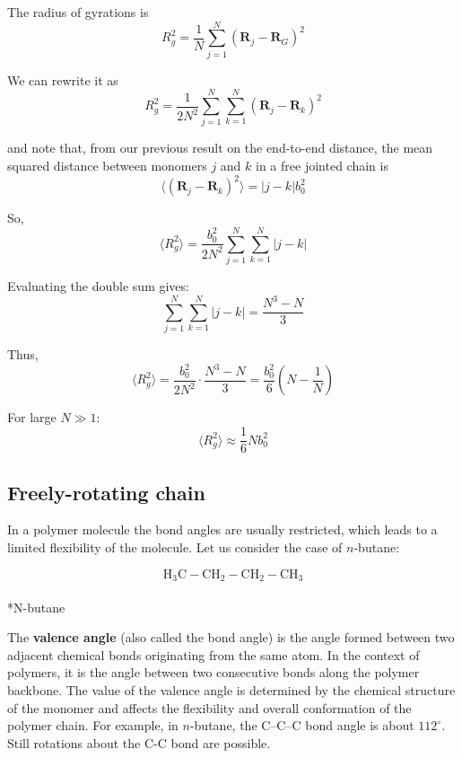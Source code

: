 \documentclass[
  letterpaper,
  enabledeprecatedfontcommands]{report}
\makeatletter
\let\oldparagraph\paragraph
\renewcommand{\paragraph}{
    \@ifstar
      \xxxParagraphStar
      \xxxParagraphNoStar
  }
\newcommand{\xxxParagraphStar}[1]{\oldparagraph*{#1}\mbox{}}
\newcommand{\xxxParagraphNoStar}[1]{\oldparagraph{#1}\mbox{}}
\makeatother
\begin{document}
\begin{tcolorbox}[enhanced jigsaw, toprule=.15mm, opacityback=0, colbacktitle=quarto-callout-note-color!10!white, title=\textcolor{quarto-callout-note-color}{\faInfo}\hspace{0.5em}{Proof}, leftrule=.75mm, rightrule=.15mm, bottomtitle=1mm, breakable, colframe=quarto-callout-note-color-frame, colback=white, toptitle=1mm, left=2mm, titlerule=0mm, coltitle=black, arc=.35mm, bottomrule=.15mm, opacitybacktitle=0.6]

The radius of gyrations is \[
R_g^2=\frac{1}{N} \sum_{j=1}^N\left(\mathbf{R}_j-\mathbf{R}_G\right)^2
\]

We can rewrite it as \[
R_g^2 = \frac{1}{2N^2} \sum_{j=1}^N \sum_{k=1}^N (\mathbf{R}_j - \mathbf{R}_k)^2
\]

and note that, from our previous result on the end-to-end distance, the
mean squared distance between monomers \(j\) and \(k\) in a free jointed
chain is \[
\langle (\mathbf{R}_j - \mathbf{R}_k)^2 \rangle = |j - k| b_0^2
\]

So, \[
\langle R_g^2 \rangle = \frac{b_0^2}{2N^2} \sum_{j=1}^N \sum_{k=1}^N |j - k|
\]

Evaluating the double sum gives: \[
\sum_{j=1}^N \sum_{k=1}^N |j - k| = \frac{N^3 - N}{3}
\]

Thus, \[
\langle R_g^2 \rangle = \frac{b_0^2}{2N^2} \cdot \frac{N^3 - N}{3} = \frac{b_0^2}{6} (N - \frac{1}{N})
\]

For large \(N \gg 1\): \[
\langle R_g^2 \rangle \approx \frac{1}{6} N b_0^2
\]

\end{tcolorbox}

\subsection{Freely-rotating chain}\label{freely-rotating-chain}

In a polymer molecule the bond angles are usually restricted, which
leads to a limited flexibility of the molecule. Let us consider the case
of \(n\)-butane:

\[
\mathrm{H}_{3} \mathrm{C}-\mathrm{CH}_{2}-\mathrm{CH}_{2}-\mathrm{CH}_{3}
\]

\paragraph*{N-butane}\label{n-butane}

The \textbf{valence angle} (also called the bond angle) is the angle
formed between two adjacent chemical bonds originating from the same
atom. In the context of polymers, it is the angle between two
consecutive bonds along the polymer backbone. The value of the valence
angle is determined by the chemical structure of the monomer and affects
the flexibility and overall conformation of the polymer chain. For
example, in \(n\)-butane, the C--C--C bond angle is about \(112^\circ\).
Still rotations about the C-C bond are possible.
\end{document}
